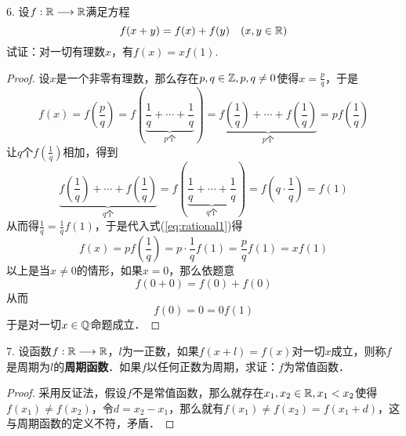 6. 设$f: \mathbb{R} \longrightarrow \mathbb{R}$满足方程
\begin{equation}
    f(x+y)=f(x)+f(y) \quad (x,y \in \mathbb{R})
\end{equation}
试证：对一切有理数$x$，有$f(x) = xf(1)$.

\begin{proof}
设$x$是一个非零有理数，那么存在$p, q \in \mathbb{Z}, p, q \neq 0$使得$x = \displaystyle\frac{p}{q}$，于是
\begin{equation}
    f(x) = f(\displaystyle\frac{p}{q}) = f(\underbrace{\displaystyle\frac{1}{q}+\cdots+\displaystyle\frac{1}{q}}_{p\text{个}}) = \underbrace{f(\displaystyle\frac{1}{q})+\cdots+f(\displaystyle\frac{1}{q})}_{p\text{个}} = p f(\displaystyle\frac{1}{q})
    \label{eq:rational1}
\end{equation}
让$q$个$f(\displaystyle\frac{1}{q})$相加，得到
\begin{equation}
    \underbrace{f(\displaystyle\frac{1}{q})+\cdots+f(\displaystyle\frac{1}{q})}_{q\text{个}} = f(\underbrace{\displaystyle\frac{1}{q}+\cdots+\displaystyle\frac{1}{q}}_{q\text{个}})=f(q \cdot \displaystyle\frac{1}{q}) = f(1)
\end{equation}
从而得$\displaystyle\frac{1}{q}=\displaystyle\frac{1}{q}f(1)$，于是代入式(\ref{eq:rational1})得
\begin{equation}
    f(x) = p f(\displaystyle\frac{1}{q}) = p \cdot \displaystyle\frac{1}{q}f(1) = \displaystyle\frac{p}{q}f(1)=xf(1)
\end{equation}
以上是当$x \neq 0$的情形，如果$x=0$，那么依题意
\begin{equation}
    f(0 + 0) = f(0) + f(0)
\end{equation}
从而
\begin{equation}
    f(0) = 0 = 0 f(1)
\end{equation}
于是对一切$x \in \mathbb{Q}$命题成立．
\end{proof}

7. 设函数$f: \mathbb{R} \longrightarrow \mathbb{R}$，$l$为一正数，如果$f(x+l)=f(x)$对一切$x$成立，则称$f$是周期为$l$的{\bfseries{周期函数}}．如果$f$以任何正数为周期，求证：$f$为常值函数．
\begin{proof}
采用反证法，假设$f$不是常值函数，那么就存在$x_1, x_2 \in \mathbb{R}, x_1 < x_2$使得$f(x_1) \neq f(x_2)$，令$d = x_2 - x_1$，那么就有$f(x_1)\neq f(x_2)=f(x_1 + d)$，这与周期函数的定义不符，矛盾．
\end{proof}

